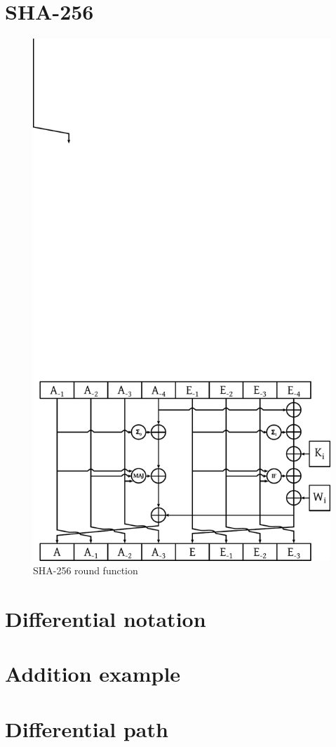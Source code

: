 \section{SHA-256}
\label{sec:dc-sha-256}


\begin{figure}[t]
  \begin{center}
    \includegraphics{img/sha256.pdf}
    \caption{SHA-256 round function}
    \label{fig:sha256-round-function}
  \end{center}
\end{figure}

\section{Differential notation}
\label{sec:dc-notation}
%
\cite{char-2006}


\section{Addition example}
\section{Differential path}
